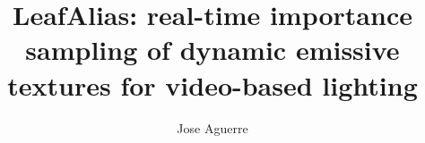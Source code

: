 \documentclass[acmtog,review]{acmart}
\begin{document}
\title{LeafAlias: real-time importance sampling of dynamic emissive textures for video-based lighting}


\author{Jose Aguerre}

\graphicspath{{images/}}
\newcommand{\FLIP}{\protect\reflectbox{F}LIP\xspace}

\newif\ifhighlight
\highlightfalse
\ifdefined\cleancopy\highlightfalse\fi
\ifhighlight
  \definecolor{newcolor}{RGB}{0,84,216}
  \definecolor{revcolor}{RGB}{226,106,0}
\else
\fi
\newcommand{\new}[1]{{\leavevmode\color{newcolor}#1}}
\newcommand{\rev}[1]{{\leavevmode\color{revcolor}#1}}
\newcommand{\newbegin}{\begingroup\color{newcolor}}
\newcommand{\newend}{\endgroup}
\newcommand{\newmat}{\color{newcolor}}
\newcommand{\revmat}{\color{revcolor}}
\DeclareRobustCommand{\newt}[1]{\textcolor{newcolor}{#1}}
\DeclareRobustCommand{\revt}[1]{\textcolor{revcolor}{#1}}
\DeclareRobustCommand{\aspnote}[1]{{\leavevmode\color{aspcolor}\textsf{\bfseries[ASPIRATIONAL\if\relax\detokenize{#1}\relax\else: #1\fi]}}}
\newcommand{\aspirational}[2][]{{\leavevmode\color{aspcolor}#2}\,\aspnote{#1}}
\newcommand{\aspcell}[1]{{\color{aspcolor}#1}}
\newcommand{\supp}[1]{supplementary document \texttt{#1}}
\end{document}

